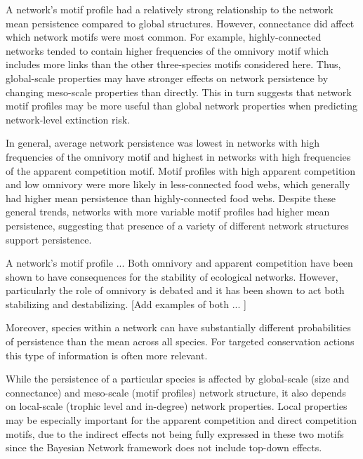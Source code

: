 \documentclass[12pt]{article}
\begin{document}
\begin{spacing}{2.0}
A network's motif profile had a relatively strong relationship to the network mean persistence compared to global structures. However, connectance did affect which network motifs were most common. For example, highly-connected networks tended to contain higher frequencies of the omnivory motif which includes more links than the other three-species motifs considered here.
Thus, global-scale properties may have stronger effects on network persistence by changing meso-scale properties than directly.
This in turn suggests that network motif profiles may be more useful than global network properties when predicting network-level extinction risk.

In general, average network persistence was lowest in networks with high frequencies of the omnivory motif and highest in networks with high frequencies of the apparent competition motif. 
Motif profiles with high apparent competition and low omnivory were more likely in less-connected food webs, which generally had higher mean persistence than highly-connected food webs.
Despite these general trends, networks with more variable motif profiles had higher mean persistence, suggesting that presence of a variety of different network structures support persistence. 

A network's motif profile ... Both omnivory and apparent competition have been shown to have consequences for the stability of ecological networks. However, particularly the role of omnivory is debated and it has been shown to act both stabilizing and destabilizing. [Add examples of both ... ]

Moreover, species within a network can have substantially different probabilities of persistence than the mean across all species. For targeted conservation actions this type of information is often more relevant. 

While the persistence of a particular species is affected by global-scale (size and connectance) and meso-scale (motif profiles) network structure, it also depends on local-scale (trophic level and in-degree) network properties.
Local properties may be especially important for the apparent competition and direct competition motifs, due to the indirect effects not being fully expressed in these two motifs since the Bayesian Network framework does not include top-down effects. 


\end{spacing}
\end{document}
